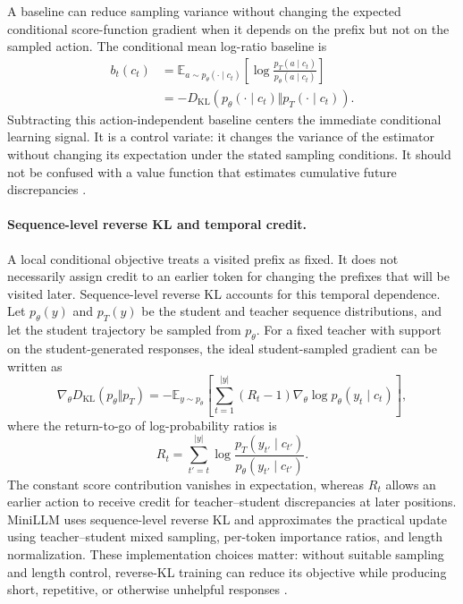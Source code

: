 A baseline can reduce sampling variance without changing the expected
conditional score-function gradient when it depends on the prefix but not
on the sampled action.  The conditional mean log-ratio baseline is
\begin{align}
    b_t(c_t)
    &=\mathbb E_{a\sim p_\theta(\cdot\mid c_t)}
      \left[
      \log\frac{p_T(a\mid c_t)}{p_\theta(a\mid c_t)}
      \right]\nonumber\\
    &=-D_{\mathrm{KL}}\left(
      p_\theta(\cdot\mid c_t)
      \Vert p_T(\cdot\mid c_t)
      \right).
    \label{eq:distillation-opd-baseline}
\end{align}
Subtracting this action-independent baseline centers the immediate
conditional learning signal.  It is a control variate: it changes the
variance of the estimator without changing its expectation under the stated
sampling conditions.  It should not be confused with a value function that
estimates cumulative future discrepancies
\parencite{Song2026OnPolicyDistillation}.

\paragraph{Sequence-level reverse KL and temporal credit.}
A local conditional objective treats a visited prefix as fixed.  It does not
necessarily assign credit to an earlier token for changing the prefixes that
will be visited later.  Sequence-level reverse KL accounts for this temporal
dependence.  Let \(p_\theta(y)\) and \(p_T(y)\) be the student and teacher
sequence distributions, and let the student trajectory be sampled from
\(p_\theta\).  For a fixed teacher with support on the student-generated
responses, the ideal student-sampled gradient can be written as
\begin{equation}
    \nabla_\theta D_{\mathrm{KL}}(p_\theta\Vert p_T)
    =-\mathbb E_{y\sim p_\theta}
    \left[
      \sum_{t=1}^{|y|}(R_t-1)
      \nabla_\theta\log p_\theta(y_t\mid c_t)
    \right],
    \label{eq:distillation-sequence-reverse-kl-gradient}
\end{equation}
where the return-to-go of log-probability ratios is
\begin{equation}
    R_t=\sum_{t'=t}^{|y|}
    \log\frac{p_T(y_{t'}\mid c_{t'})}
    {p_\theta(y_{t'}\mid c_{t'})}.
    \label{eq:distillation-sequence-return}
\end{equation}
The constant score contribution vanishes in expectation, whereas \(R_t\)
allows an earlier action to receive credit for teacher--student discrepancies
at later positions.  MiniLLM uses sequence-level reverse KL and approximates
the practical update using teacher--student mixed sampling, per-token
importance ratios, and length normalization.  These implementation choices
matter: without suitable sampling and length control, reverse-KL training can
reduce its objective while producing short, repetitive, or otherwise
unhelpful responses \parencite{Song2026OnPolicyDistillation}.

